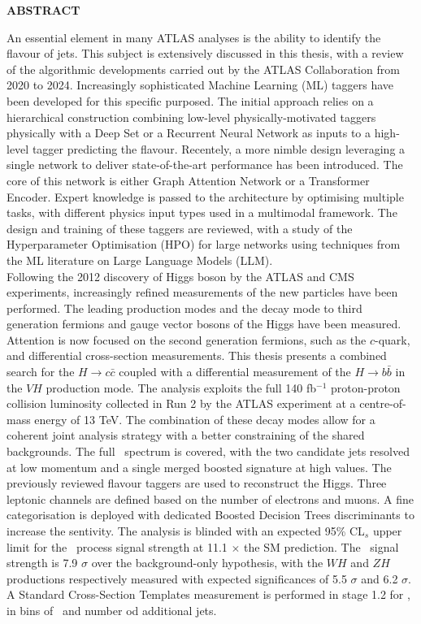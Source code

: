 
\vspace*{\fill}
\begin{center}
\textbf{\large \color{oxfordblue} ABSTRACT}
\end{center}
An essential element in many ATLAS analyses is the ability to identify the flavour of jets. This subject is extensively discussed in this thesis, with a review of the algorithmic developments carried out by the ATLAS Collaboration from 2020 to 2024. Increasingly sophisticated Machine Learning (ML) taggers have been developed for this specific purposed. The initial approach relies on a hierarchical construction combining low-level physically-motivated taggers physically with a Deep Set or a Recurrent Neural Network as inputs to a high-level tagger predicting the flavour. Recentely, a more nimble design leveraging a single network to deliver state-of-the-art performance has been introduced. The core of this network is either Graph Attention Network or a Transformer Encoder. Expert knowledge is passed to the architecture by optimising multiple tasks, with different physics input types used in a multimodal framework. The design and training of these taggers are reviewed, with a study of the Hyperparameter Optimisation (HPO) for large networks using techniques from the ML literature on Large Language Models (LLM). \\

Following the 2012 discovery of Higgs boson by the ATLAS and CMS experiments, increasingly refined measurements of the new particles have been performed. The leading production modes and the decay mode to third generation fermions and gauge vector bosons of the Higgs have been measured. Attention is now focused on the second generation fermions, such as the $c$-quark, and differential cross-section measurements. This thesis presents a combined search for the $H \rightarrow c\bar{c}$ coupled with a differential measurement of the $H \rightarrow b\bar{b}$ in the $VH$ production mode. The analysis exploits the full 140 fb$^{-1}$ proton-proton collision luminosity collected in Run 2 by the ATLAS experiment at a centre-of-mass energy of 13 TeV. The combination of these decay modes allow for a coherent joint analysis strategy with a better constraining of the shared backgrounds. The full \pt\ spectrum is covered, with the two candidate jets resolved at low momentum and a single merged boosted signature at high values. The previously reviewed flavour taggers are used to reconstruct the Higgs. Three leptonic channels are defined based on the number of electrons and muons. A fine categorisation is deployed with dedicated Boosted Decision Trees discriminants to increase the sentivity. The analysis is blinded with an expected 95\% CL$_s$ upper limit for the \vhc\ process signal strength at 11.1 $\times$ the SM prediction. The \vhb\ signal strength is 7.9 $\sigma$ over the background-only hypothesis, with the $WH$ and $ZH$ productions respectively measured with expected significances of 5.5 $\sigma$ and 6.2 $\sigma$. A Standard Cross-Section Templates measurement is performed in stage 1.2 for \vhb, in bins of \pt\ and number od additional jets.
\vspace*{\fill}

